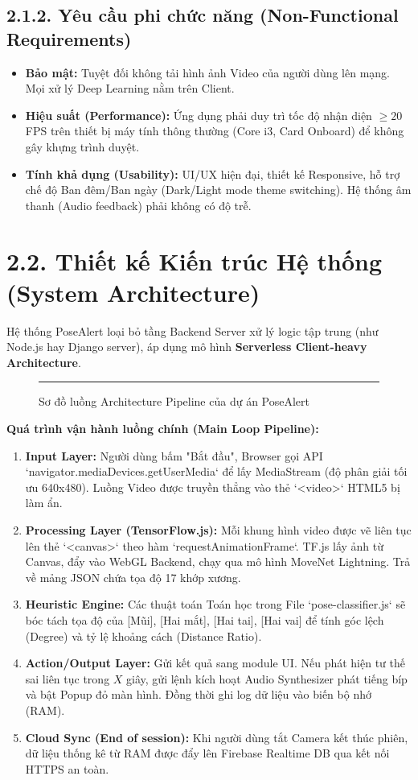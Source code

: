 \documentclass[12pt,a4paper]{report}
\begin{document}
\subsection{2.1.2. Yêu cầu phi chức năng (Non-Functional Requirements)}
\begin{itemize}
    \item \textbf{Bảo mật:} Tuyệt đối không tải hình ảnh Video của người dùng lên mạng. Mọi xử lý Deep Learning nằm trên Client.
    \item \textbf{Hiệu suất (Performance):} Ứng dụng phải duy trì tốc độ nhận diện $\ge 20$ FPS trên thiết bị máy tính thông thường (Core i3, Card Onboard) để không gây khựng trình duyệt.
    \item \textbf{Tính khả dụng (Usability):} UI/UX hiện đại, thiết kế Responsive, hỗ trợ chế độ Ban đêm/Ban ngày (Dark/Light mode theme switching). Hệ thống âm thanh (Audio feedback) phải không có độ trễ.
\end{itemize}

\section{2.2. Thiết kế Kiến trúc Hệ thống (System Architecture)}
Hệ thống PoseAlert loại bỏ tầng Backend Server xử lý logic tập trung (như Node.js hay Django server), áp dụng mô hình \textbf{Serverless Client-heavy Architecture}.

\begin{figure}[H]
    \centering
    \rule{0.9\textwidth}{7cm} 
    \caption{Sơ đồ luồng Architecture Pipeline của dự án PoseAlert}
\end{figure}

\textbf{Quá trình vận hành luồng chính (Main Loop Pipeline):}
\begin{enumerate}
    \item \textbf{Input Layer:} Người dùng bấm "Bắt đầu", Browser gọi API `navigator.mediaDevices.getUserMedia` để lấy MediaStream (độ phân giải tối ưu 640x480). Luồng Video được truyền thẳng vào thẻ `<video>` HTML5 bị làm ẩn.
    \item \textbf{Processing Layer (TensorFlow.js):} Mỗi khung hình video được vẽ liên tục lên thẻ `<canvas>` theo hàm `requestAnimationFrame`. TF.js lấy ảnh từ Canvas, đẩy vào WebGL Backend, chạy qua mô hình MoveNet Lightning. Trả về mảng JSON chứa tọa độ 17 khớp xương.
    \item \textbf{Heuristic Engine:} Các thuật toán Toán học trong File `pose-classifier.js` sẽ bóc tách tọa độ của [Mũi], [Hai mắt], [Hai tai], [Hai vai] để tính góc lệch (Degree) và tỷ lệ khoảng cách (Distance Ratio).
    \item \textbf{Action/Output Layer:} Gửi kết quả sang module UI. Nếu phát hiện tư thế sai liên tục trong $X$ giây, gửi lệnh kích hoạt Audio Synthesizer phát tiếng bíp và bật Popup đỏ màn hình. Đồng thời ghi log dữ liệu vào biến bộ nhớ (RAM).
    \item \textbf{Cloud Sync (End of session):} Khi người dùng tắt Camera kết thúc phiên, dữ liệu thống kê từ RAM được đẩy lên Firebase Realtime DB qua kết nối HTTPS an toàn.
\end{enumerate}
\end{document}
